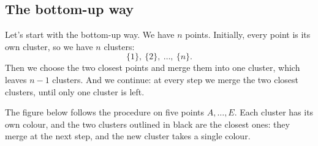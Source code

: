 \documentclass[a4paper,12pt,oneside]{report}
\begin{document}
\subsection{The bottom-up way}

Let's start with the bottom-up way. We have $n$ points. Initially, every
point is its own cluster, so we have $n$ clusters:
\[
  \{1\},\ \{2\},\ \ldots,\ \{n\}.
\]
Then we choose the two closest points and merge them into one cluster,
which leaves $n-1$ clusters. And we continue: at every step we merge
the two closest clusters, until only one cluster is left.

The figure below follows the procedure on five points $A,\ldots,E$.
Each cluster has its own colour, and the two clusters outlined in black
are the closest ones: they merge at the next step, and the new cluster
takes a single colour.
\end{document}
